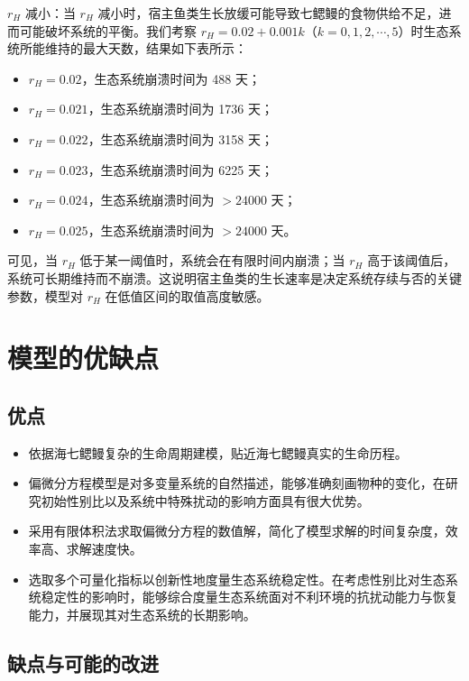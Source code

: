 \documentclass[11pt,a4paper]{ctexart}
\begin{document}
$r_H$ 减小：当 $r_H$ 减小时，宿主鱼类生长放缓可能导致七鳃鳗的食物供给不足，进而可能破坏系统的平衡。我们考察 $r_H=0.02+0.001k$（$k=0,1,2,\cdots,5$）时生态系统所能维持的最大天数，结果如下表所示：

\begin{itemize}
\item $r_H=0.02$，生态系统崩溃时间为 488 天；
\item $r_H=0.021$，生态系统崩溃时间为 1736 天；
\item $r_H=0.022$，生态系统崩溃时间为 3158 天；
\item $r_H=0.023$，生态系统崩溃时间为 6225 天；
\item $r_H=0.024$，生态系统崩溃时间为 $>24000$ 天；
\item $r_H=0.025$，生态系统崩溃时间为 $>24000$ 天。
\end{itemize}

可见，当 $r_H$ 低于某一阈值时，系统会在有限时间内崩溃；当 $r_H$ 高于该阈值后，系统可长期维持而不崩溃。这说明宿主鱼类的生长速率是决定系统存续与否的关键参数，模型对 $r_H$ 在低值区间的取值高度敏感。

\section{模型的优缺点}

\subsection{优点}

\begin{itemize}
\item 依据海七鳃鳗复杂的生命周期建模，贴近海七鳃鳗真实的生命历程。
\item 偏微分方程模型是对多变量系统的自然描述，能够准确刻画物种的变化，在研究初始性别比以及系统中特殊扰动的影响方面具有很大优势。
\item 采用有限体积法求取偏微分方程的数值解，简化了模型求解的时间复杂度，效率高、求解速度快。
\item 选取多个可量化指标以创新性地度量生态系统稳定性。在考虑性别比对生态系统稳定性的影响时，能够综合度量生态系统面对不利环境的抗扰动能力与恢复能力，并展现其对生态系统的长期影响。
\end{itemize}

\subsection{缺点与可能的改进}
\end{document}
